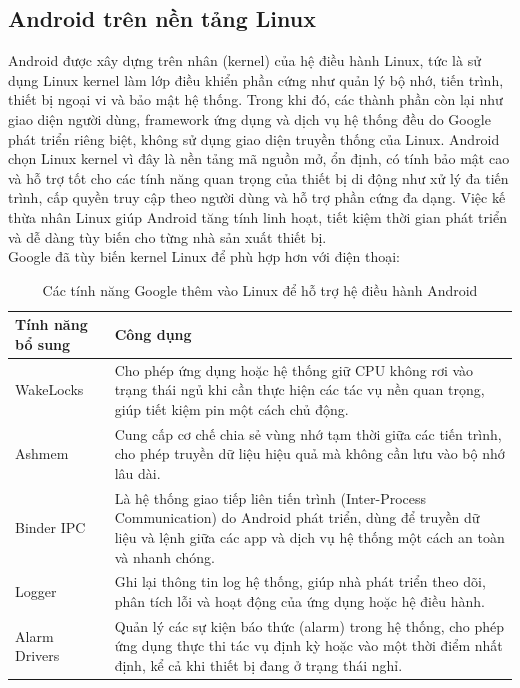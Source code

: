\subsection{Android trên nền tảng Linux}
\renewcommand{\labelitemi}{--}    
    \hspace*{0.8cm}Android được xây dựng trên nhân (kernel) của hệ điều hành Linux, tức là sử dụng Linux kernel làm lớp điều khiển phần cứng như quản lý bộ nhớ, tiến trình, thiết bị ngoại vi và bảo mật hệ thống. Trong khi đó, các thành phần còn lại như giao diện người dùng, framework ứng dụng và dịch vụ hệ thống đều do Google phát triển riêng biệt, không sử dụng giao diện truyền thống của Linux. Android chọn Linux kernel vì đây là nền tảng mã nguồn mở, ổn định, có tính bảo mật cao và hỗ trợ tốt cho các tính năng quan trọng của thiết bị di động như xử lý đa tiến trình, cấp quyền truy cập theo người dùng và hỗ trợ phần cứng đa dạng. Việc kế thừa nhân Linux giúp Android tăng tính linh hoạt, tiết kiệm thời gian phát triển và dễ dàng tùy biến cho từng nhà sản xuất thiết bị.\\
    \hspace*{0.8cm}Google đã tùy biến kernel Linux để phù hợp hơn với điện thoại:
    \begin{table}[H]
        \centering
        \renewcommand{\arraystretch}{1.5}
        \begin{tabular}{|p{3.5cm}|p{12cm}|}
            \hline
            \textbf{Tính năng bổ sung} & \textbf{Công dụng} \\
            \hline
            WakeLocks & Cho phép ứng dụng hoặc hệ thống giữ CPU không rơi vào trạng thái ngủ khi cần thực hiện các tác vụ nền quan trọng, giúp tiết kiệm pin một cách chủ động. \\
            \hline
            Ashmem  & Cung cấp cơ chế chia sẻ vùng nhớ tạm thời giữa các tiến trình, cho phép truyền dữ liệu hiệu quả mà không cần lưu vào bộ nhớ lâu dài. \\
            \hline
            Binder IPC & Là hệ thống giao tiếp liên tiến trình (Inter-Process Communication) do Android phát triển, dùng để truyền dữ liệu và lệnh giữa các app và dịch vụ hệ thống một cách an toàn và nhanh chóng. \\
            \hline
            Logger & Ghi lại thông tin log hệ thống, giúp nhà phát triển theo dõi, phân tích lỗi và hoạt động của ứng dụng hoặc hệ điều hành. \\
            \hline
            Alarm Drivers & Quản lý các sự kiện báo thức (alarm) trong hệ thống, cho phép ứng dụng thực thi tác vụ định kỳ hoặc vào một thời điểm nhất định, kể cả khi thiết bị đang ở trạng thái nghỉ. \\
            \hline
        \end{tabular}
        \caption{Các tính năng Google thêm vào Linux để hỗ trợ hệ điều hành Android}
        \label{table:android-linux-features}
        \end{table}          


